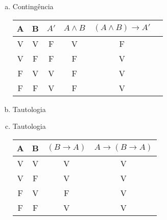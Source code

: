 \begin{Gabarito}{9}
\begin{enumerate}[a)]
      \item Contingência \\
      \begin{tabular}{|c|c|c|c|c|c|}
        \hline
        A & B & $A'$ & $A \land B$ & $(A \land B) \rightarrow A'$ \\
        \hline
        V & V & F & V & F \\
        V & F & F & F & V \\
        F & V & V & F & V \\
        F & F & V & F & V \\
        \hline
      \end{tabular}

      \item Tautologia \\
      \item Tautologia \\
      \begin{tabular}{|c|c|c|c|}
        \hline
        A & B & $(B \rightarrow A)$ & $A \rightarrow (B \rightarrow A)$ \\
        \hline
        V & V & V & V \\
        V & F & V & V \\
        F & V & F & V \\
        F & F & V & V \\
        \hline
      \end{tabular}


\end{enumerate}
\end{Gabarito}
